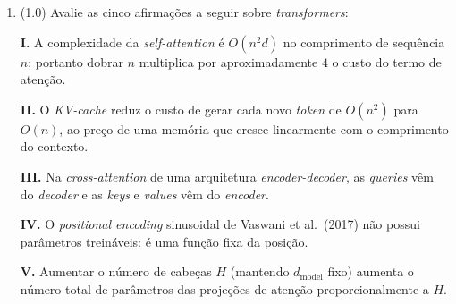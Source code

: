\documentclass[11pt,a4paper]{article}
\begin{document}
\begin{enumerate}[1)]
\textbf{III.} A \textit{self-attention} é permutação-equivariante; por isso é necessário acrescentar \textit{positional encoding} à entrada.

\textbf{IV.} Dividir os \textit{scores} por $d$ (em vez de $\sqrt{d}$) também manteria a variância dos \textit{scores} em $1$.

\textbf{V.} A máscara causal atribui o valor $0$ às posições futuras \emph{antes} do \textit{softmax}.

\begin{enumerate}[a)]
    \item Apenas I, II e III estão corretas.
    \item Apenas I, II, III e IV estão corretas.
    \item Apenas I e III estão corretas.
    \item Apenas II, III e IV estão corretas.
    \item Apenas I, III e V estão corretas.
    \item Apenas III, IV e V estão corretas.
    \item Todas as afirmações estão corretas.
    \item Apenas I e II estão corretas.
\end{enumerate}

\item (1.0) Avalie as cinco afirmações a seguir sobre \textit{transformers}:

\textbf{I.} A complexidade da \textit{self-attention} é $O(n^2 d)$ no comprimento de sequência $n$; portanto dobrar $n$ multiplica por aproximadamente $4$ o custo do termo de atenção.

\textbf{II.} O \textit{KV-cache} reduz o custo de gerar cada novo \textit{token} de $O(n^2)$ para $O(n)$, ao preço de uma memória que cresce linearmente com o comprimento do contexto.

\textbf{III.} Na \textit{cross-attention} de uma arquitetura \textit{encoder-decoder}, as \textit{queries} vêm do \textit{decoder} e as \textit{keys} e \textit{values} vêm do \textit{encoder}.

\textbf{IV.} O \textit{positional encoding} sinusoidal de Vaswani et al.\ (2017) não possui parâmetros treináveis: é uma função fixa da posição.

\textbf{V.} Aumentar o número de cabeças $H$ (mantendo $d_{\text{model}}$ fixo) aumenta o número total de parâmetros das projeções de atenção proporcionalmente a $H$.


\end{enumerate}
\end{document}

